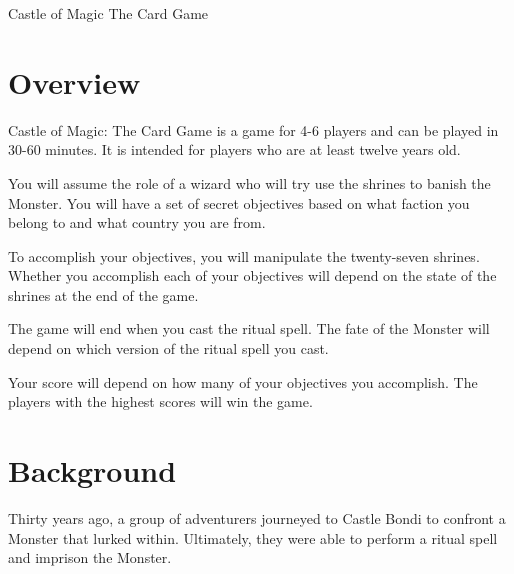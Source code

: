 \documentclass[10pt, parskip=half-, twoside]{scrartcl}
\begin{document}
{
\phantom{a}
\setmainfont[Scale=3.0]{Tex Gyre Chorus}
\center \Huge \textcolor{WildStrawberry}{Castle of Magic}
\vfill
\center \large \textcolor{WildStrawberry}{The Card Game}
\phantom{a}
}

\newpage
{}

\section*{Overview}
Castle of Magic: The Card Game is a game for 4-6 players and can be played in 30-60 minutes. It is intended for players who are at least twelve years old.

You will assume the role of a wizard who will try use the shrines to banish the Monster. You will have a set of secret objectives based on what faction you belong to and what country you are from.

To accomplish your objectives, you will manipulate the twenty-seven shrines. Whether you accomplish each of your objectives will depend on the state of the shrines at the end of the game.

The game will end when you cast the ritual spell. The fate of the Monster will depend on which version of the ritual spell you cast.

Your score will depend on how many of your objectives you accomplish. The players with the highest scores will win the game.

\section*{Background}
Thirty years ago, a group of adventurers journeyed to Castle Bondi to confront a Monster that lurked within.
Ultimately, they were able to perform a ritual spell and imprison the Monster.
\end{document}
